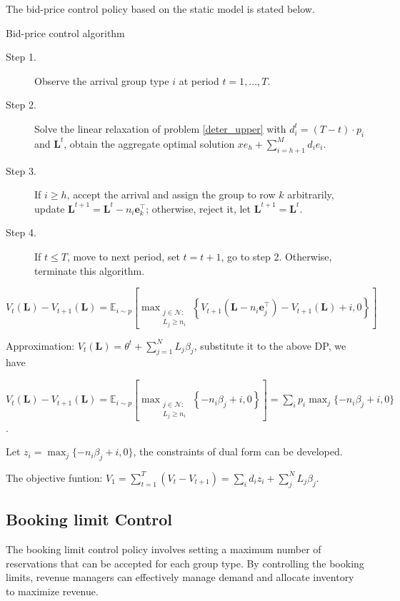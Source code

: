 The bid-price control policy based on the static model is stated below.
\begin{algorithm}[H]
  \caption{Bid-price control algorithm}
  \begin{description}
    \item[Step 1.] Observe the arrival group type $i$ at period $t = 1, \ldots, T$.
    \item[Step 2.] Solve the linear relaxation of problem \eqref{deter_upper} with $d_i^{t} = (T-t) \cdot p_i$ and $\mathbf{L}^{t}$, obtain the aggregate optimal solution $x e_{h} + \sum_{i=h+1} ^{M} d_{i} e_{i}$.
    \item[Step 3.] If $i \geq h$, accept the arrival and assign the group to row $k$ arbitrarily, update $\mathbf{L}^{t+1} = \mathbf{L}^{t} - n_i \mathbf{e}_{k}^{\top}$; otherwise, reject it, let $\mathbf{L}^{t+1} = \mathbf{L}^{t}$.
    \item[Step 4.] If $t \leq T$, move to next period, set $t = t+1$, go to step 2. Otherwise, terminate this algorithm.
  \end{description}
\end{algorithm}

$V_{t}(\mathbf{L}) - V_{t+1}(\mathbf{L}) = \mathbb{E}_{i \sim p}\left[\max_{\substack{j \in \mathcal{N}: \\ L_j \geqslant {n}_{i}}}\left\{V_{t+1}\left(\mathbf{L}- n_{i}\mathbf{e}_j^{\intercal} \right)- V_{t+1}(\mathbf{L}) + i, 0 \right\}\right]$

Approximation: $V_{t}(\mathbf{L}) = \theta^{t} + \sum_{j=1}^{N} L_j \beta_j$, substitute it to the above DP, we have 

$V_{t}(\mathbf{L}) - V_{t+1}(\mathbf{L}) = \mathbb{E}_{i \sim p}\left[\max_{\substack{j \in \mathcal{N}: \\ L_j \geqslant {n}_{i}}}\left\{-n_i \beta_j + i, 0 \right\}\right] = \sum_i p_i \max_{j} \{-n_i \beta_j + i, 0\}$.

Let $z_i = \max_{j} \{-n_i \beta_j + i, 0\}$, the constraints of dual form can be developed.

The objective funtion: $V_{1} = \sum_{t=1}^{T} (V_{t} - V_{t+1}) = \sum_{i} d_{i} z_{i} + \sum_{j}^{N} L_{j} \beta_j$.

\subsection{Booking limit Control}
The booking limit control policy involves setting a maximum number of reservations that can be accepted for each group type. By controlling the booking limits, revenue managers can effectively manage demand and allocate inventory to maximize revenue.


